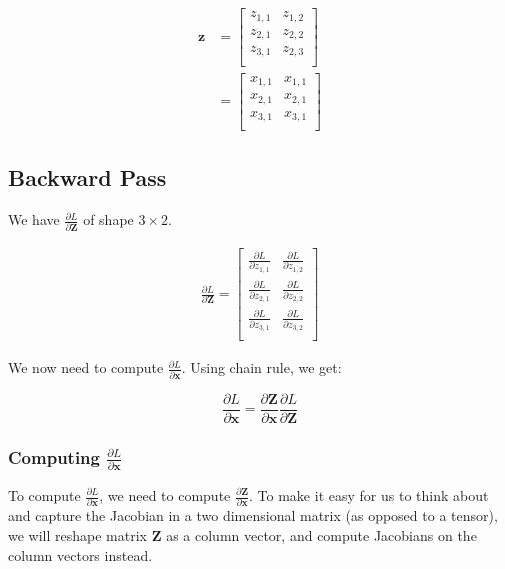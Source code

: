 \documentclass{article}
\newcommand{\vecr}[1]{\bm{#1}}
\newcommand{\matr}[1]{\mathbf{#1}} %
\begin{document}
\begin{align}
\vecr{z} &=
\begin{bmatrix}
z_{1,1} & z_{1,2} \\
z_{2,1} & z_{2,2} \\
z_{3,1} & z_{2,3} \\
\end{bmatrix}
\nonumber \\
&=
\begin{bmatrix}
x_{1,1} & x_{1,1} \\
x_{2,1} & x_{2,1} \\
x_{3,1} & x_{3,1} \\
\end{bmatrix}
\end{align}

\subsection{Backward Pass}
We have $\frac{\partial L}{\partial \matr{Z}}$ of shape $3 \times 2$.

\begin{align}
\frac{\partial L}{\partial \matr{Z}} =
\begin{bmatrix}
\frac{\partial L}{\partial z_{1,1}} & \frac{\partial L}{\partial z_{1,2}} \\[0.7em]
\frac{\partial L}{\partial z_{2,1}} & \frac{\partial L}{\partial z_{2,2}} \\[0.7em]
\frac{\partial L}{\partial z_{3,1}} & \frac{\partial L}{\partial z_{3,2}} \\[0.7em]
\end{bmatrix} \label{dZAsColumnVector_column_vector}
\end{align}

We now need to compute $\frac{\partial L}{\partial \vecr{x}}$. Using chain rule, we get:

\begin{equation} \label{dX_broadcast_column_vector}
\frac{\partial L}{\partial \vecr{x}} = \frac{\partial \matr{Z}}{\partial \vecr{x}}\frac{\partial L}{\partial \matr{Z}}
\end{equation}

\subsubsection{Computing $\frac{\partial L}{\partial \vecr{x}}$}
To compute $\frac{\partial L}{\partial \vecr{x}}$, we need to compute $\frac{\partial \matr{Z}}{\partial \vecr{x}}$. To make it easy for us to think about and capture the Jacobian in a two dimensional matrix (as opposed to a tensor), we will reshape matrix $\matr{Z}$ as a column vector, and compute Jacobians on the column vectors instead.
\end{document}
